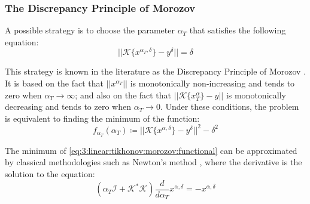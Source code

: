 			\subsubsection{The Discrepancy Principle of Morozov}\label{chap:methods:linear:tikhonov:morozov}
					
				A possible strategy is to choose the parameter $\alpha_T$ that satisfies the following equation:
				\begin{equation}
					||\mathcal{K}\{x^{\alpha_T,\delta}\}-y^\delta|| = \delta \label{eq:3:linear:tikhonov:morozov:equation}
				\end{equation}
			
				This strategy is known in the literature as the Discrepancy Principle of Morozov \citep{morozov1984methods,kirsch2011introduction}. It is based on the fact that $||x^{\alpha_T}||$ is monotonically non-increasing and tends to zero when $\alpha_T\rightarrow\infty$; and also on the fact that $||\mathcal{K}\{x^\alpha_T\}-y||$ is monotonically decreasing and tends to zero when $\alpha_T\rightarrow0$. Under these conditions, the problem is equivalent to finding the minimum of the function:
			 	\begin{equation}
				 	f_{\alpha_T}(\alpha_T) \coloneqq ||\mathcal{K}\{x^{\alpha,\delta}\}-y^\delta||^2 - \delta^2 \label{eq:3:linear:tikhonov:morozov:functional}
				\end{equation}
				
				The minimum of \eqref{eq:3:linear:tikhonov:morozov:functional} can be approximated by classical methodologies such as Newton's method \citep{rao2019introduction}, where the derivative is the solution to the equation:
				\begin{equation}
					\left(\alpha_T\mathcal{I}+\mathcal{K}^*\mathcal{K}\right)\frac{d}{d\alpha_T}x^{\alpha,\delta} = -x^{\alpha,\delta} \label{eq:3:linear:tikhonov:morozov:derivative}
				\end{equation}
			
